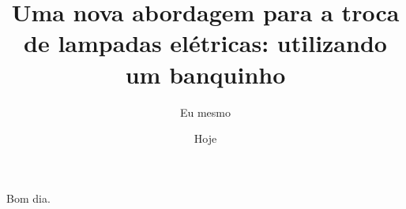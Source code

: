 \documentclass{article}
\author{Eu mesmo}
\date{Hoje}
\title{Uma nova abordagem para a troca de
       lampadas elétricas: utilizando um banquinho}
\begin{document}
\maketitle

\newpage

Bom dia.
\end{document}
